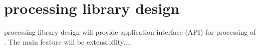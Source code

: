 
\section{\lsystem processing library design}

\lsystem processing library design will provide application interface (API) for processing of \lsystems.
The main feature will be extensibility....



















